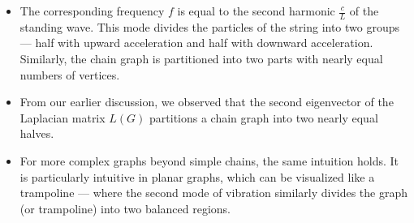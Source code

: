 \documentclass[aspectratio=169]{beamer}
\begin{document}
\begin{frame}

\begin{itemize}
    \item The corresponding frequency \( f \) is equal to the second harmonic \( \frac{c}{L} \) of the standing wave. This mode divides the particles of the string into two groups — half with upward acceleration and half with downward acceleration. 
    Similarly, the chain graph is partitioned into two parts with nearly equal numbers of vertices.
    
    \item From our earlier discussion, we observed that the second eigenvector of the Laplacian matrix \( L(G) \) partitions a chain graph into two nearly equal halves.

    \item For more complex graphs beyond simple chains, the same intuition holds. It is particularly intuitive in planar graphs, which can be visualized like a trampoline — where the second mode of vibration similarly divides the graph (or trampoline) into two balanced regions.
\end{itemize}

\end{frame}

















































\end{document}
